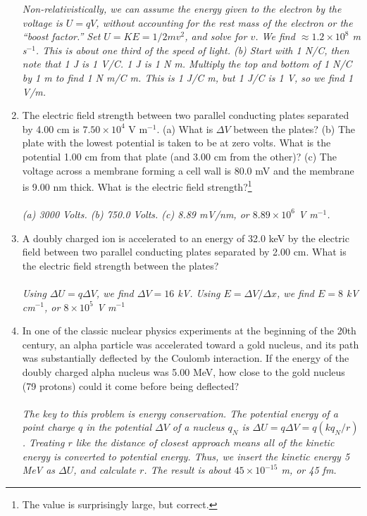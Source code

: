 \documentclass[12pt,twocolumn]{article}
\begin{document}
\begin{enumerate}
\textit{Non-relativistically, we can assume the energy given to the electron by the voltage is $U = qV$, without accounting for the rest mass of the electron or the ``boost factor.''  Set $U = KE = 1/2 m v^2$, and solve for $v$.  We find $\approx 1.2 \times 10^{8}$ m s$^{-1}$.  This is about one third of the speed of light. (b) Start with 1 N/C, then note that 1 J is 1 V/C.  1 J is 1 N m.  Multiply the top and bottom of 1 N/C by 1 m to find 1 N m/C m.  This is 1 J/C m, but 1 J/C is 1 V, so we find 1 V/m.}
\item The electric field strength between two parallel conducting plates separated by 4.00 cm is $7.50 \times 10^4$ V m$^{-1}$. (a) What is $\Delta V$ between the plates? (b) The plate with the lowest potential is taken to be at zero volts. What is the potential 1.00 cm from that plate (and 3.00 cm from the other)? (c) The voltage across a membrane forming a cell wall is 80.0 mV and the membrane is 9.00 nm thick. What is the electric field strength?\footnote{The value is surprisingly large, but correct.} \\ \\
\textit{(a) 3000 Volts.  (b) 750.0 Volts. (c) 8.89 mV/nm, or $8.89 \times 10^{6}$ V m$^{-1}$.}
\item A doubly charged ion is accelerated to an energy of 32.0 keV by the electric field between two parallel conducting plates separated by 2.00 cm. What is the electric field strength between the plates? \\ \\
\textit{Using $\Delta U = q \Delta V$, we find $\Delta V = 16$ kV.  Using $E = \Delta V/\Delta x$, we find $E = 8$ kV cm$^{-1}$, or $8 \times 10^5$ V m$^{-1}$}
\item In one of the classic nuclear physics experiments at the beginning of the 20th century, an alpha particle was accelerated toward a gold nucleus, and its path was substantially deflected by the Coulomb interaction. If the energy of the doubly charged alpha nucleus was 5.00 MeV, how close to the gold nucleus (79 protons) could it come before being deflected? \\ \\
\textit{The key to this problem is energy conservation.  The potential energy of a point charge $q$ in the potential $\Delta V$ of a nucleus $q_N$ is $\Delta U = q \Delta V = q(k q_N/r)$.  Treating $r$ like the distance of closest approach means all of the kinetic energy is converted to potential energy.  Thus, we insert the kinetic energy 5 MeV as $\Delta U$, and calculate $r$.  The result is about $45 \times 10^{-15}$ m, or 45 fm.}
\end{enumerate}
\end{document}
